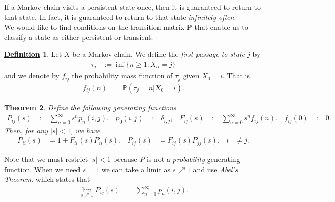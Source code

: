 \documentclass[12pt]{book}
\numberwithin{equation}{chapter}
\theoremstyle{plain}
\newtheorem{theorem}{\underline{Theorem}}
\numberwithin{theorem}{section}
\theoremstyle{definition}
\newtheorem{definition}[theorem]{\underline{Definition}}
\numberwithin{exercise}{chapter}
\newcommand{\<}{\langle}
\renewcommand{\>}{\rangle}
\renewcommand{\(}{\left(}
\renewcommand{\)}{\right)}
\renewcommand{\[}{\left[}
\renewcommand{\]}{\right]}
\newcommand\Pb{\mathds{P}}
\newcommand\del{\delta}
\newcommand\Pv{\pmb{P}}
\begin{document}
\noindent
If a Markov chain visits a persistent state once, then it is guaranteed to return to that state.  In fact, it is guaranteed to return to that state \emph{infinitely often}.
\\[0.5em]
We would like to find conditions on the transition matrix $\Pv$ that enable us to classify a state as either persistent or transient.

\begin{definition}
\label{def:hitting.time}
Let $X$ be a Markov chain.  We define the \emph{first passage to state $j$} by
\begin{align}
\tau_j
	&:=	\inf\{ n \geq 1 : X_n = j \}
\end{align}
and we denote by $f_{ij}$ the probability mass function of $\tau_j$ given $X_0 = i$.  That is
\begin{align}
f_{ij}(n)
	&=	\Pb( \tau_j = n | X_0 = i ).
\end{align}
\end{definition}

\begin{theorem}
Define the following generating functions
\begin{align}
P_{ij}(s) 
	&:= \sum_{n=0}^\infty s^n p_n(i,j) , & 
p_0(i,j)
	&:=	\del_{i,j} , &
F_{ij}(s)
	&:=	\sum_{n=0}^\infty s^n f_{ij}(n) , &
f_{ij}(0)
	&:=	0 .
\end{align}
Then, for any $|s|<1$, we have
\begin{align}
P_{ii}(s)
	&=	1 + F_{ii}(s)P_{ii}(s) , &
P_{ij}(s)
	&=	F_{ij}(s)P_{jj}(s) , &
i
	&\neq j . \label{eq:Pij=FijPjj}
\end{align}
\end{theorem}

\noindent
Note that we must restrict $|s|<1$ because $P$ is not a \emph{probability} generating function.  When we need $s=1$ we can take a limit as $s \nearrow 1$ and use \emph{Abel's Theorem}. which states that
\begin{align}
\lim_{s \nearrow 1} P_{ij}(s)
	&=	\sum_{n=0}^\infty p_n(i,j) . \label{eq:Abel}
\end{align}
\end{document}
